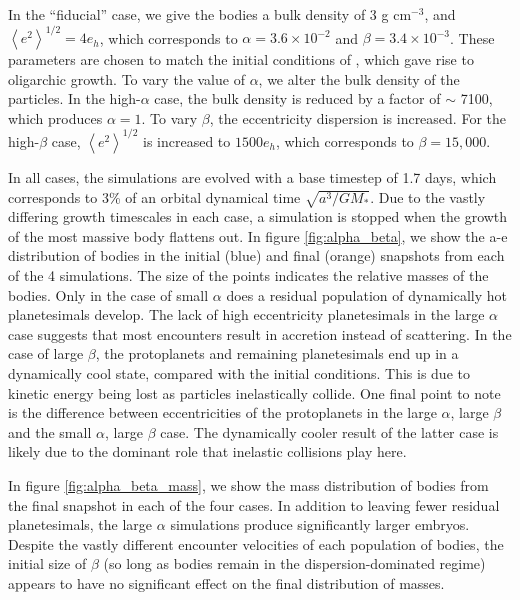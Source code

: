 \documentclass[twocolumn]{aastex63}
\begin{document}
In the ``fiducial'' case, we give the bodies a bulk density of 3 g
cm$^{-3}$, and $\left< e^{2} \right>^{1/2} = 4 e_{h}$, which corresponds to $\alpha = 3.6 \times 10^{-2}$ and $\beta = 3.4 \times 10^{-3}$. These parameters are chosen to match the initial conditions of \citet{kokubo98}, which gave rise to oligarchic growth. To vary the value of $\alpha$, we alter the bulk density of the particles. In the high-$\alpha$ case, the bulk density is reduced by a factor of $\sim$ 7100, which produces $\alpha = 1$. To vary $\beta$, the eccentricity dispersion is increased. For the high-$\beta$ case, $\left< e^{2} \right>^{1/2}$ is increased to $1500 e_{h}$, which corresponds to $\beta = 15,000$.

In all cases, the simulations are evolved with a base timestep of 1.7
days, which corresponds to 3\% of an orbital dynamical time
$\sqrt{a^3/G M_{*}}$. Due to the vastly differing growth timescales in
each case, a simulation is stopped when the growth of the most massive
body flattens out. In figure \ref{fig:alpha_beta}, we show the a-e
distribution of bodies in the initial (blue) and final (orange)
snapshots from each of the 4 simulations. The size of the points
indicates the relative masses of the bodies. Only in the case of small
$\alpha$ does a residual population of dynamically hot planetesimals
develop. The lack of high eccentricity planetesimals in the large
$\alpha$ case suggests that most encounters result in accretion
instead of scattering. In the case of large $\beta$, the protoplanets
and remaining planetesimals end up in a dynamically cool state,
compared with the initial conditions. This is due to kinetic energy 
being lost as particles inelastically collide. One final point to note 
is the difference between eccentricities of the protoplanets in the 
large $\alpha$, large $\beta$ and the small $\alpha$,
large $\beta$ case. The dynamically cooler result of the latter case
is likely due to the dominant role that inelastic collisions play here.

In figure \ref{fig:alpha_beta_mass}, we show the mass distribution of bodies from the final snapshot in each of the four cases. In addition to leaving fewer residual planetesimals, the large $\alpha$ simulations produce significantly larger embryos. Despite the vastly different encounter velocities of each population of bodies, the initial size of $\beta$ (so long as bodies remain in the dispersion-dominated regime) appears to have no significant effect on the final distribution of masses.
\end{document}
